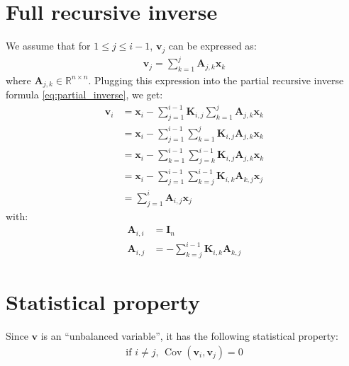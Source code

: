 \documentclass[12pt]{article}
\DeclareMathOperator{\Cov}{Cov}
\begin{document}
\section{Full recursive inverse}
We assume that for $1 \le j \le i-1$, $\mathbf{v}_j$ can be expressed as:
\begin{align}
\mathbf{v}_j = \sum_{k=1}^j \mathbf{A}_{j,k} \mathbf{x}_k
\end{align}
where $\mathbf{A}_{j,k} \in \mathbb{R}^{n \times n}$. Plugging this expression into the partial recursive inverse formula \eqref{eq:partial_inverse}, we get:
\begin{align}
\label{eq:full_inverse}
\mathbf{v}_i & = \mathbf{x}_i - \sum_{j=1}^{i-1} \mathbf{K}_{i,j} \sum_{k=1}^j \mathbf{A}_{j,k} \mathbf{x}_k \nonumber \\
& = \mathbf{x}_i - \sum_{j=1}^{i-1} \sum_{k=1}^j \mathbf{K}_{i,j} \mathbf{A}_{j,k} \mathbf{x}_k \nonumber \\
& = \mathbf{x}_i - \sum_{k=1}^{i-1} \sum_{j=k}^{i-1} \mathbf{K}_{i,j} \mathbf{A}_{j,k} \mathbf{x}_k \nonumber \\
& = \mathbf{x}_i - \sum_{j=1}^{i-1} \sum_{k=j}^{i-1} \mathbf{K}_{i,k} \mathbf{A}_{k,j} \mathbf{x}_j \nonumber \\
& = \sum_{j=1}^i \mathbf{A}_{i,j} \mathbf{x}_j
\end{align}
with:
\begin{align}
\mathbf{A}_{i,i} & = \mathbf{I}_n \\
\mathbf{A}_{i,j} & = - \sum_{k=j}^{i-1} \mathbf{K}_{i,k} \mathbf{A}_{k,j}
\end{align}

\section{Statistical property}
Since $\mathbf{v}$ is an ``unbalanced variable'', it has the following statistical property:
\begin{align}
\label{eq:stat_prop}
\text{if } i \ne j \text{, }\Cov\left(\mathbf{v}_i,\mathbf{v}_j\right) = 0
\end{align}
\end{document}
